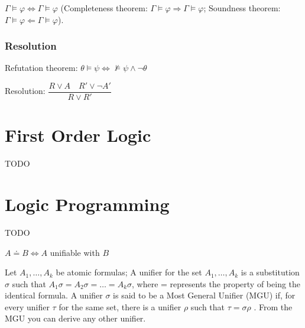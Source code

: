 \documentclass[]{article}
\begin{document}

\noindent $\Gamma \models \varphi \iff \Gamma \models \varphi$ (Completeness theorem: $\Gamma \models \varphi \Rightarrow \Gamma \models \varphi$; Soundness theorem: $\Gamma \models \varphi \Leftarrow \Gamma \models \varphi$).

\subsubsection{Resolution}

\noindent Refutation theorem: $\theta \models \psi \iff \not\models \psi \land \neg\theta$

\noindent Resolution: $\dfrac{R \lor A \hspace{1em} R' \lor \neg A'}{R \lor R'}$

\section{First Order Logic}

TODO

\section{Logic Programming}

TODO

$ A \doteq B \Leftrightarrow A $ unifiable with $ B $

Let $A_1, \dots, A_k$ be atomic formulas; A unifier for the set ${A_1,\dots, A_k}$ is a substitution $\sigma$ such that $A_1 \sigma = A_2 \sigma = \dots = A_k \sigma$, where = represents the property of being the identical formula.
A unifier $\sigma$ is said to be a Most General Unifier (MGU) if, for every unifier $\tau$ for the same set, there is a unifier $\rho$ such that $\tau = \sigma \rho$ . From the MGU you can derive any other unifier.
\end{document}

